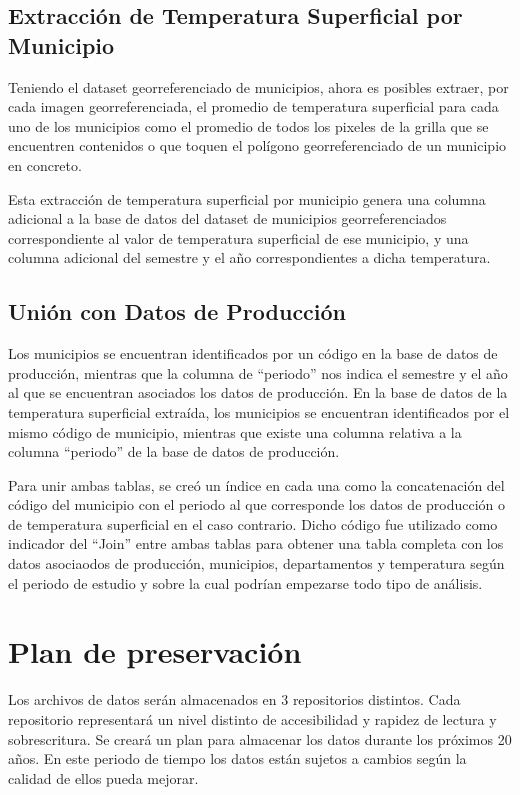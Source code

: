 \documentclass[12pt, spanish]{article}
\begin{document}
\subsection{Extracción de Temperatura Superficial por Municipio}

Teniendo el dataset georreferenciado de municipios, ahora es posibles extraer, por cada imagen georreferenciada, el promedio de temperatura superficial para cada uno de los municipios como el promedio de todos los pixeles de la grilla que se encuentren contenidos o que toquen el polígono georreferenciado de un municipio en concreto.

Esta extracción de temperatura superficial por municipio genera una columna adicional a la base de datos del dataset de municipios georreferenciados correspondiente al valor de temperatura superficial de ese municipio, y una columna adicional del semestre y el año correspondientes a dicha temperatura.

\subsection{Unión con Datos de Producción}

Los municipios se encuentran identificados por un código en la base de datos de producción, mientras que la columna de ``periodo'' nos indica el semestre y el año al que se encuentran asociados los datos de producción. En la base de datos de la temperatura superficial extraída, los municipios se encuentran identificados por el mismo código de municipio, mientras que existe una columna relativa a la columna ``periodo''  de la base de datos de producción.

Para unir ambas tablas, se creó un índice en cada una como la concatenación del código del municipio con el periodo al que corresponde los datos de producción o de temperatura superficial en el caso contrario. Dicho código fue utilizado como indicador del ``Join''  entre ambas tablas para obtener una tabla completa con los datos asociaodos de producción, municipios, departamentos y temperatura según el periodo de estudio y sobre la cual podrían empezarse todo tipo de análisis.



\section{Plan de preservación}
Los archivos de datos serán almacenados en 3 repositorios distintos. Cada repositorio representará un nivel distinto de accesibilidad y rapidez de lectura y sobrescritura. Se creará un plan para almacenar los datos durante los próximos 20 años. En este periodo de tiempo los datos están sujetos a cambios según la calidad de ellos pueda mejorar.
\end{document}

